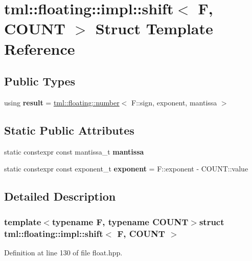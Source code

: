 \hypertarget{structtml_1_1floating_1_1impl_1_1shift}{\section{tml\+:\+:floating\+:\+:impl\+:\+:shift$<$ F, C\+O\+U\+N\+T $>$ Struct Template Reference}
\label{structtml_1_1floating_1_1impl_1_1shift}
}
\subsection*{Public Types}
\begin{DoxyCompactItemize}
\item 
\hypertarget{structtml_1_1floating_1_1impl_1_1shift_a4e2857fca646a13ba68bca641fefaacd}{using {\bfseries result} = \hyperlink{structtml_1_1floating_1_1number}{tml\+::floating\+::number}$<$ F\+::sign, exponent, mantissa $>$}\label{structtml_1_1floating_1_1impl_1_1shift_a4e2857fca646a13ba68bca641fefaacd}

\end{DoxyCompactItemize}
\subsection*{Static Public Attributes}
\begin{DoxyCompactItemize}
\item 
static constexpr const mantissa\+\_\+t {\bfseries mantissa}
\item 
\hypertarget{structtml_1_1floating_1_1impl_1_1shift_ae69c07e2da1629e40fb6faf6371e7ebf}{static constexpr const exponent\+\_\+t {\bfseries exponent} = F\+::exponent -\/ C\+O\+U\+N\+T\+::value}\label{structtml_1_1floating_1_1impl_1_1shift_ae69c07e2da1629e40fb6faf6371e7ebf}

\end{DoxyCompactItemize}


\subsection{Detailed Description}
\subsubsection*{template$<$typename F, typename C\+O\+U\+N\+T$>$struct tml\+::floating\+::impl\+::shift$<$ F, C\+O\+U\+N\+T $>$}



Definition at line 130 of file float.\+hpp.



